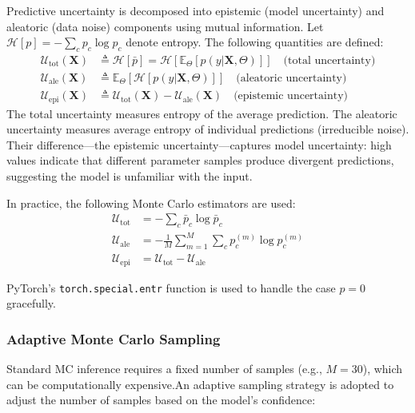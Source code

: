 \documentclass[lettersize,journal]{IEEEtran}
\begin{document}
Predictive uncertainty is decomposed into epistemic (model uncertainty) and aleatoric (data noise) components using mutual information. Let $\mathcal{H}[p] = -\sum_c p_c \log p_c$ denote entropy. The following quantities are defined:
\begin{align}
\mathcal{U}_{\text{tot}}(\mathbf{X}) &\triangleq \mathcal{H}[\bar{p}] = \mathcal{H}\left[\mathbb{E}_{\Theta}[p(y|\mathbf{X},\Theta)]\right] \quad \text{(total uncertainty)} \\
\mathcal{U}_{\text{ale}}(\mathbf{X}) &\triangleq \mathbb{E}_{\Theta}\left[\mathcal{H}[p(y|\mathbf{X},\Theta)]\right] \quad \text{(aleatoric uncertainty)} \\
\mathcal{U}_{\text{epi}}(\mathbf{X}) &\triangleq \mathcal{U}_{\text{tot}}(\mathbf{X}) - \mathcal{U}_{\text{ale}}(\mathbf{X}) \quad \text{(epistemic uncertainty)}
\end{align}
The total uncertainty measures entropy of the average prediction. The aleatoric uncertainty measures average entropy of individual predictions (irreducible noise). Their difference---the epistemic uncertainty---captures model uncertainty: high values indicate that different parameter samples produce divergent predictions, suggesting the model is unfamiliar with the input.

In practice, the following Monte Carlo estimators are used:
\begin{align}
\mathcal{U}_{\text{tot}} &= -\sum_c \bar{p}_c \log \bar{p}_c \\
\mathcal{U}_{\text{ale}} &= -\frac{1}{M} \sum_{m=1}^M \sum_c p_c^{(m)} \log p_c^{(m)} \\
\mathcal{U}_{\text{epi}} &= \mathcal{U}_{\text{tot}} - \mathcal{U}_{\text{ale}}
\end{align}

PyTorch's \texttt{torch.special.entr} function is used to handle the case $p=0$ gracefully.

\subsubsection{Adaptive Monte Carlo Sampling}

Standard MC inference requires a fixed number of samples (e.g., $M=30$), which can be computationally expensive.An adaptive sampling strategy is adopted to adjust the number of samples based on the model's confidence:
\end{document}
